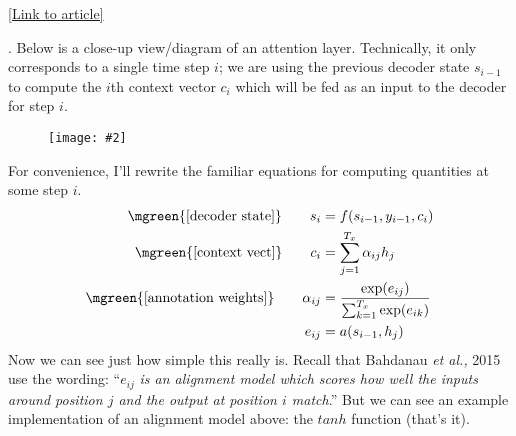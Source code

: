 \documentclass[11pt]{article}
\newcommand\myfig[2][0.3\textwidth]{\begin{figure}[h!]\centering\texttt{[image: \#2]}\end{figure}}
\newcommand\myspace[1][]{\vspace{#1\bigskipamount}}
\newcommand\p{\Needspace{10\baselineskip} \noindent}
\begin{document}
{\scriptsize \href{https://theneuralperspective.com/2016/11/20/recurrent-neural-network-rnn-part-4-attentional-interfaces/}{[Link to article]}}


\myspace
\p {}. Below is a close-up view/diagram of an attention layer. Technically, it only corresponds to a single time step $i$; we are using the previous decoder state $s_{i - 1}$ to compute the $i$th context vector $c_i$ which will be fed as an input to the decoder for step $i$. 
\myfig[0.5\textwidth]{AttnMech.png}

For convenience, I'll rewrite the familiar equations for computing quantities at some step $i$.
\begin{align}
\mgreen{\text{[decoder state]}} \qquad
s_i &= f(s_{i - 1}, y_{i - 1}, c_i) \\
\mgreen{\text{[context vect]}} \qquad
c_i &= \sum_{j = 1}^{T_x} \alpha_{ij} h_j \\
\mgreen{\text{[annotation weights]}} \qquad
\alpha_{ij} &= \frac{\exp(e_{ij})}{\sum_{k = 1}^{T_x} \exp(e_{ik})} \\
e_{ij} &= a(s_{i - 1}, h_j) 
\end{align}
Now we can see just how simple this really is. Recall that Bahdanau \textit{et al.,} 2015 use the wording: ``$e_{ij}$ \textit{is an alignment model which scores how well the inputs around position $j$ and the output at position $i$ match}.'' But we can see an example implementation of an alignment model above: the $tanh$ function (that's it).


















\label{Appendix}
\end{document}
